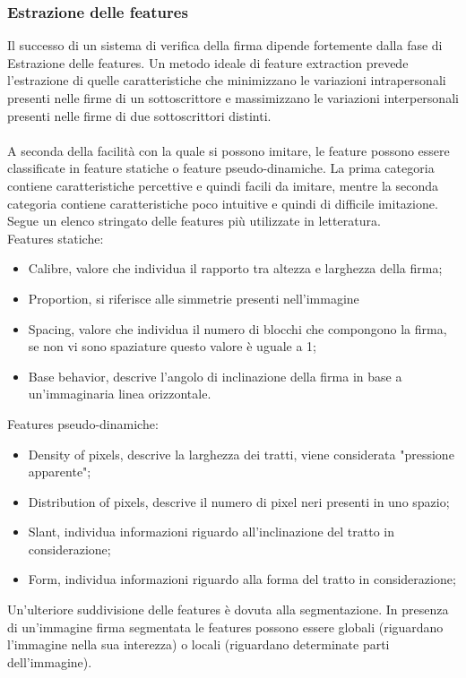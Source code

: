 \subsubsection*{Estrazione delle features}
\label{2.1.3.2}
Il successo di un sistema di verifica della firma dipende fortemente dalla fase di Estrazione delle features. Un metodo ideale di feature extraction prevede l'estrazione di quelle caratteristiche che minimizzano le variazioni intrapersonali presenti nelle firme di un sottoscrittore e massimizzano le variazioni interpersonali presenti nelle firme di due sottoscrittori distinti\cite{2}.\\\\
A seconda della facilità con la quale si possono imitare, le feature possono essere classificate in feature statiche o feature pseudo-dinamiche. La prima categoria contiene caratteristiche percettive e quindi facili da imitare, mentre la seconda categoria contiene caratteristiche poco intuitive e quindi di difficile imitazione\cite{3}.
Segue un elenco stringato delle features più utilizzate in letteratura.\\
Features statiche:
\begin{itemize}
\item Calibre, valore che individua il rapporto tra altezza e larghezza della firma;
\item Proportion, si riferisce alle simmetrie presenti nell'immagine
\item Spacing, valore che individua il numero di blocchi che compongono la firma, se non vi sono spaziature questo valore è uguale a 1;
\item Base behavior, descrive l'angolo di inclinazione della firma in base a un'immaginaria linea orizzontale.
\end{itemize}
Features pseudo-dinamiche:
\begin{itemize}
\item Density of pixels, descrive la larghezza dei tratti, viene considerata "pressione apparente";
\item Distribution of pixels, descrive il numero di pixel neri presenti in uno spazio;
\item Slant, individua informazioni riguardo all'inclinazione del tratto in considerazione;
\item Form, individua informazioni riguardo alla forma del tratto in considerazione;
\end{itemize}
Un'ulteriore suddivisione delle features è dovuta alla segmentazione. In presenza di un'immagine firma segmentata le features possono essere globali (riguardano l'immagine nella sua interezza) o locali (riguardano determinate parti dell'immagine).\\\\
